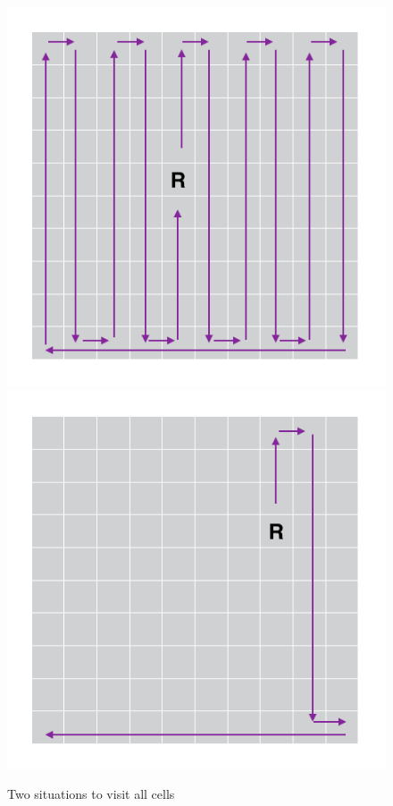 \documentclass[paper=a4, fontsize=11pt]{scrartcl} %
\numberwithin{equation}{section} %
\numberwithin{figure}{section} %
\numberwithin{table}{section} %
\begin{document}
\begin{figure}[h]
    \includegraphics[scale=0.5]{image3.png}
    \hspace{\fill}
    \includegraphics[scale=0.5]{image4.png}
    \caption{Two situations to visit all cells}
    \label{fig:Problem1.3}
\end{figure}
\end{document}
